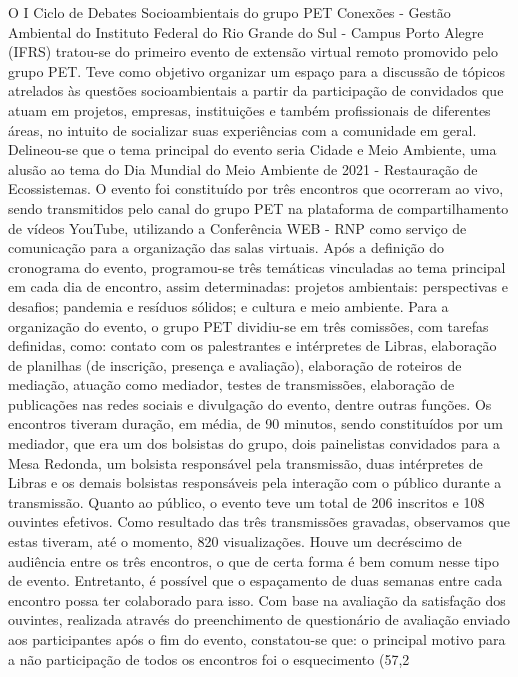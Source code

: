 O I Ciclo de Debates Socioambientais do grupo PET Conexões - Gestão Ambiental do Instituto
Federal do Rio Grande do Sul - Campus Porto Alegre (IFRS) tratou-se do primeiro evento de
extensão virtual remoto promovido pelo grupo PET. Teve como objetivo organizar um espaço
para a discussão de tópicos atrelados às questões socioambientais a partir da participação de
convidados que atuam em projetos, empresas, instituições e também profissionais de diferentes
áreas, no intuito de socializar suas experiências com a comunidade em geral. Delineou-se que o
tema principal do evento seria Cidade e Meio Ambiente, uma alusão ao tema do Dia Mundial do
Meio Ambiente de 2021 - Restauração de Ecossistemas.
O evento foi constituído por três encontros que ocorreram ao vivo, sendo transmitidos pelo canal
do grupo PET na plataforma de compartilhamento de vídeos YouTube, utilizando a Conferência
WEB - RNP como serviço de comunicação para a organização das salas virtuais. Após a
definição do cronograma do evento, programou-se três temáticas vinculadas ao tema principal
em cada dia de encontro, assim determinadas: projetos ambientais: perspectivas e desafios;
pandemia e resíduos sólidos; e cultura e meio ambiente.
Para a organização do evento, o grupo PET dividiu-se em três comissões, com tarefas definidas,
como: contato com os palestrantes e intérpretes de Libras, elaboração de planilhas (de inscrição,
presença e avaliação), elaboração de roteiros de mediação, atuação como mediador, testes de
transmissões, elaboração de publicações nas redes sociais e divulgação do evento, dentre outras
funções. Os encontros tiveram duração, em média, de 90 minutos, sendo constituídos por um
mediador, que era um dos bolsistas do grupo, dois painelistas convidados para a Mesa Redonda,
um bolsista responsável pela transmissão, duas intérpretes de Libras e os demais bolsistas
responsáveis pela interação com o público durante a transmissão.
Quanto ao público, o evento teve um total de 206 inscritos e 108 ouvintes efetivos. Como
resultado das três transmissões gravadas, observamos que estas tiveram, até o momento, 820
visualizações. Houve um decréscimo de audiência entre os três encontros, o que de certa forma é
bem comum nesse tipo de evento. Entretanto, é possível que o espaçamento de duas semanas
entre cada encontro possa ter colaborado para isso.
Com base na avaliação da satisfação dos ouvintes, realizada através do preenchimento de
questionário de avaliação enviado aos participantes após o fim do evento, constatou-se que: o
principal motivo para a não participação de todos os encontros foi o esquecimento (57,2%
